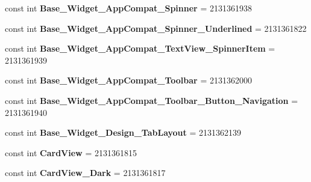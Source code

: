 \begin{DoxyCompactItemize}
const int {\bfseries Base\+\_\+\+Widget\+\_\+\+App\+Compat\+\_\+\+Spinner} = 2131361938
\item 
\mbox{\label{class_pinned_app_1_1_droid_1_1_resource_1_1_style_a1d69e09d8a78466142c213fde709635f}} 
const int {\bfseries Base\+\_\+\+Widget\+\_\+\+App\+Compat\+\_\+\+Spinner\+\_\+\+Underlined} = 2131361822
\item 
\mbox{\label{class_pinned_app_1_1_droid_1_1_resource_1_1_style_a00dd13027ce4b08d6e63c1aa7cdd254c}} 
const int {\bfseries Base\+\_\+\+Widget\+\_\+\+App\+Compat\+\_\+\+Text\+View\+\_\+\+Spinner\+Item} = 2131361939
\item 
\mbox{\label{class_pinned_app_1_1_droid_1_1_resource_1_1_style_a633d9eab8e84b55652430318ddc026a0}} 
const int {\bfseries Base\+\_\+\+Widget\+\_\+\+App\+Compat\+\_\+\+Toolbar} = 2131362000
\item 
\mbox{\label{class_pinned_app_1_1_droid_1_1_resource_1_1_style_a331fe8bd65814509139d2e8e519499b8}} 
const int {\bfseries Base\+\_\+\+Widget\+\_\+\+App\+Compat\+\_\+\+Toolbar\+\_\+\+Button\+\_\+\+Navigation} = 2131361940
\item 
\mbox{\label{class_pinned_app_1_1_droid_1_1_resource_1_1_style_a3765c460e57b8d9222d4cf756ecbd609}} 
const int {\bfseries Base\+\_\+\+Widget\+\_\+\+Design\+\_\+\+Tab\+Layout} = 2131362139
\item 
\mbox{\label{class_pinned_app_1_1_droid_1_1_resource_1_1_style_ab738bd84ea2d8c016cc2ae8238f7352a}} 
const int {\bfseries Card\+View} = 2131361815
\item 
\mbox{\label{class_pinned_app_1_1_droid_1_1_resource_1_1_style_ab81cfc65fc4188904286ca98c853982c}} 
const int {\bfseries Card\+View\+\_\+\+Dark} = 2131361817
\item 
\mbox{\label{class_pinned_app_1_1_droid_1_1_resource_1_1_style_a049686a102af979b97b5ae65f7f91d0d}} 

\end{DoxyCompactItemize}
